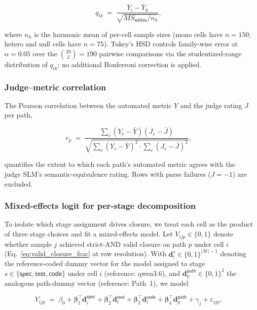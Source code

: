 \begin{equation}
  q_{ik}
  \;=\;
  \frac{\bar{Y}_i - \bar{Y}_k}{\sqrt{MS_{\textsf{within}} / n_h}},
  \label{eq:tukey}
\end{equation}

where $n_h$ is the harmonic mean of per-cell sample sizes (mono cells have $n = 150$; hetero and null cells have $n = 75$). Tukey's HSD controls family-wise error at $\alpha = 0.05$ over the $\binom{20}{2} = 190$ pairwise comparisons via the studentized-range distribution of $q_{ik}$; no additional Bonferroni correction is applied.

\subsubsection{Judge--metric correlation}

The Pearson correlation between the automated metric $Y$ and the judge rating $J$ per path,

\begin{equation}
  r_p \;=\; \frac{\textstyle\sum_{r} (Y_r - \bar{Y})(J_r - \bar{J})}{\sqrt{\textstyle\sum_r (Y_r - \bar{Y})^2 \cdot \textstyle\sum_r (J_r - \bar{J})^2}},
  \label{eq:corr}
\end{equation}

quantifies the extent to which each path's automated metric agrees with the judge SLM's semantic-equivalence rating. Rows with parse failures ($J = -1$) are excluded.

\subsubsection{Mixed-effects logit for per-stage decomposition}

To isolate which stage assignment drives closure, we treat each cell as the product of three stage choices and fit a mixed-effects model. Let $V_{ijp} \in \{0, 1\}$ denote whether sample $j$ achieved strict-AND valid closure on path $p$ under cell $i$ (Eq.~\ref{eq:valid_closure_frac} at row resolution). With $\mathbf{d}^{s}_i \in \{0, 1\}^{|\mathcal{M}| - 1}$ denoting the reference-coded dummy vector for the model assigned to stage $s \in \{\textsf{spec}, \textsf{test}, \textsf{code}\}$ under cell $i$ (reference: qwen3.6), and $\mathbf{d}^{\textsf{path}}_p \in \{0, 1\}^{2}$ the analogous path-dummy vector (reference: Path~1), we model

\begin{equation}
  V_{ijp}
  \;=\;
  \beta_0
  + \boldsymbol{\beta}_1^\top \mathbf{d}^{\textsf{spec}}_i
  + \boldsymbol{\beta}_2^\top \mathbf{d}^{\textsf{test}}_i
  + \boldsymbol{\beta}_3^\top \mathbf{d}^{\textsf{code}}_i
  + \boldsymbol{\beta}_4^\top \mathbf{d}^{\textsf{path}}_p
  + \gamma_j
  + \varepsilon_{ijp},
  \label{eq:mixedlogit}
\end{equation}


